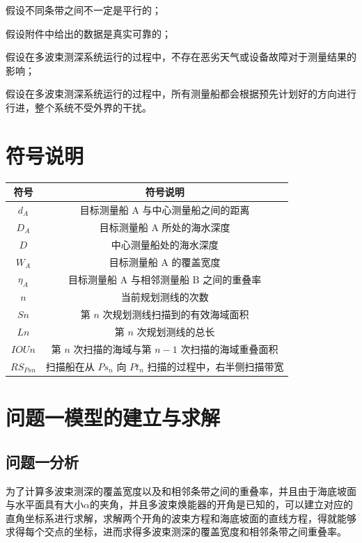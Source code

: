 \documentclass[12pt,a4paper]{article}
\begin{document}
	假设不同条带之间不一定是平行的；
	
	假设附件中给出的数据是真实可靠的；
	
	假设在多波束测深系统运行的过程中，不存在恶劣天气或设备故障对于测量结果的影响；
	
	假设在多波束测深系统运行的过程中，所有测量船都会根据预先计划好的方向进行行进，整个系统不受外界的干扰。
	
	\section{符号说明}
	
\begin{center}
		\begin{tabular}{cc}
	\toprule 符号 & 符号说明 \\
	\midrule$d_A$ & 目标测量船 A 与中心测量船之间的距离 \\
		$D_A$ & 目标测量船 A 所处的海水深度 \\
		$D$ & 中心测量船处的海水深度 \\
		$W_A$ & 目标测量船 $\mathrm{A}$ 的覆盖宽度 \\
		$\eta_A$ & 目标测量船 $\mathrm{A}$ 与相邻测量船 $\mathrm{B}$ 之间的重叠率 \\
		$n$ & 当前规划测线的次数 \\
		$S n$ & 第 $n$ 次规划测线扫描到的有效海域面积 \\
		$L n$ & 第 $n$ 次规划测线的总长 \\
		 $IOUn$ & 第 $n$ 次扫描的海域与第 $n-1$ 次扫描的海域重叠面积 \\
		$R S_{P s n}$ & 扫描船在从 $P s_n$ 向 $P t_n$ 扫描的过程中，右半侧扫描带宽 \\
		\bottomrule
	\end{tabular}
\end{center}
	
\section{问题一模型的建立与求解}
	\subsection{问题一分析}
	为了计算多波束测深的覆盖宽度以及和相邻条带之间的重叠率，并且由于海底坡面与水平面具有大小$\alpha$的夹角，并且多波束焕能器的开角是已知的，可以建立对应的直角坐标系进行求解，求解两个开角的波束方程和海底坡面的直线方程，得就能够求得每个交点的坐标，进而求得多波束测深的覆盖宽度和相邻条带之间重叠率。
\end{document}
